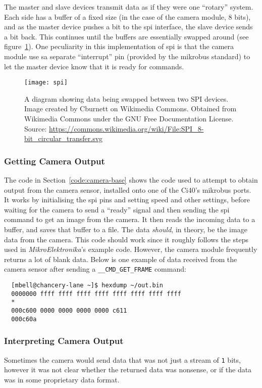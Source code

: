 The master and slave devices transmit data as if they were one ``rotary''
system. Each side has a buffer of a fixed size (in the case of the camera
module, 8 bits), and as the master device pushes a bit to the \acrshort{spi}
interface, the slave device sends a bit back. This continues until the
buffers are essentially swapped around (see figure~\ref{fig:spi}). One
peculiarity in this implementation of \acrshort{spi} is that the camera
module use sa separate ``interrupt'' pin (provided by the \gls{mikrobus}
standard) to let the master device know that it is ready for commands.

\begin{figure}[h]
  \centering
  \texttt{[image: spi]}
  \caption{A diagram showing data being swapped between two SPI devices.
  Image created by Cburnett on Wikimedia Commons. Obtained from Wikimedia
  Commons under the GNU Free Documentation License. Source: 
  \url{https://commons.wikimedia.org/wiki/File:SPI_8-bit_circular_transfer.svg}}
  \label{fig:spi}
\end{figure}

\subsubsection{Getting Camera Output}
The code in Section~\ref{code:camera-base} shows the code used to attempt to
obtain output from the camera sensor, installed onto one of the Ci40's
\gls{mikrobus} ports. It works by initialising the \acrshort{spi} pins and
setting speed and other settings, before waiting for the camera to send a
``ready'' signal and then sending the \acrshort{spi} command to get an image
from the camera. It then reads the incoming data to a buffer, and saves that
buffer to a file. The data \textit{should}, in theory, be the image data from
the camera. This code should work since it roughly follows the steps used in
\textit{MikroElektronika}'s example code. However, the camera module
frequently returns a lot of blank data. Below is one example of data received
from the camera sensor after sending a \texttt{\_\_CMD\_GET\_FRAME} command:

\begin{verbatim}
  [mbell@chancery-lane ~]$ hexdump ~/out.bin
  0000000 ffff ffff ffff ffff ffff ffff ffff ffff
  *
  000c600 0000 0000 0000 0000 c611               
  000c60a
\end{verbatim}

\subsubsection{Interpreting Camera Output}
Sometimes the camera would send data that was not just a stream of \texttt{1}
bits, however it was not clear whether the returned data was nonsense, or if
the data was in some proprietary data format.

